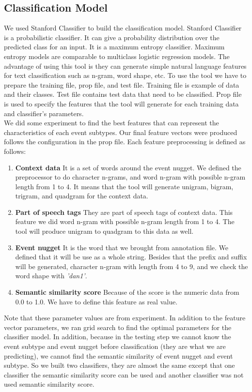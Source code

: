 \documentclass[11pt]{article}
\begin{document}
\subsection{Classification Model}
\label{classifier}
We used Stanford Classifier to build the classification model. Stanford Classifier \cite{Man:03} is a probabilistic classifier. It can give a probability distribution over the predicted class for an input. It is a maximum entropy classifier. Maximum entropy models are comparable to multiclass logistic regression models. The advantage of using this tool is they can generate simple natural language features for text classification such as n-gram, word shape, etc. To use the tool we have to prepare the training file, prop file, and test file. Training file is example of data and their classes. Test file contains test data that need to be classified. Prop file is used to specify the features that the tool will generate for each training data and classifier’s parameters.\\
\indent We did some experiment to find the best features that can represent the characteristics of each event subtypes. Our final feature vectors were produced follows the configuration in the prop file. Each feature preprocessing is defined as follows:
\begin{enumerate}
\item \textbf{Context data} It is a set of words around the event nugget. We defined the preprocessor to do character n-grams, and word n-gram with possible n-gram length from 1 to 4. It means that the tool will generate unigram, bigram, trigram, and quadgram for the context data.
\item \textbf{Part of speech tags} They are part of speech tags of context data. This feature we did word n-gram with possible n-gram length from 1 to 4. The tool will produce unigram to quadgram to this data as well.
\item \textbf{Event nugget} It is the word that we brought from annotation file. We defined that it will be use as a whole string. Besides that the prefix and suffix will be generated, character n-gram with length from 4 to 9, and we check the word shape with {\em 'dan1'}.
\item \textbf{Semantic similarity score} Because of the score is the numeric data from 0.0 to 1.0. We have to define this feature as real value.
\end{enumerate}
Note that these parameter values are from experiment. In addition to the feature vector parameters, we ran grid search to find the optimal parameters for the classifier model. In addition, because in the testing step we cannot know the event subtype and event nugget before classification (they are what we are predicting), we cannot find the semantic similarity of event nugget and event subtype. So we built two classifiers, they are almost the same except that one classifier the semantic similarity score can be used and another classifier was not used semantic similarity score.
\end{document}
